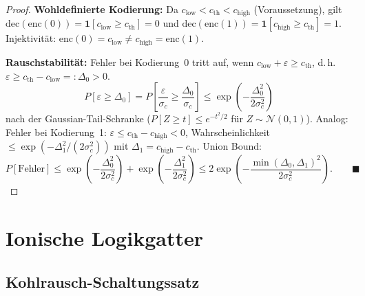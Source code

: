 ﻿\documentclass[a4paper,12pt]{article}
\theoremstyle{plain}
\theoremstyle{definition}
\theoremstyle{remark}
\newcommand{\cth}{c_{\mathrm{th}}}
\begin{document}
\begin{proof}
\textbf{Wohldefinierte Kodierung:}
Da $c_{\mathrm{low}} < \cth < c_{\mathrm{high}}$ (Voraussetzung),
gilt $\mathrm{dec}(\mathrm{enc}(0)) = \mathbf{1}[c_{\mathrm{low}} \geq \cth] = 0$
und $\mathrm{dec}(\mathrm{enc}(1)) = \mathbf{1}[c_{\mathrm{high}} \geq \cth] = 1$.
Injektivit\"at: $\mathrm{enc}(0) = c_{\mathrm{low}} \neq c_{\mathrm{high}} = \mathrm{enc}(1)$.

\textbf{Rauschstabilit\"at:}
Fehler bei Kodierung~0 tritt auf, wenn $c_{\mathrm{low}} + \varepsilon \geq \cth$,
d.\,h.\ $\varepsilon \geq \cth - c_{\mathrm{low}} =: \Delta_0 > 0$.
\[
P[\varepsilon \geq \Delta_0] = P\!\left[\frac{\varepsilon}{\sigma_c} \geq \frac{\Delta_0}{\sigma_c}\right]
\leq \exp\!\left(-\frac{\Delta_0^2}{2\sigma_c^2}\right)
\]
nach der Gaussian-Tail-Schranke ($P[Z \geq t] \leq e^{-t^2/2}$ f\"ur $Z \sim \mathcal{N}(0,1)$).
Analog: Fehler bei Kodierung~1: $\varepsilon \leq \cth - c_{\mathrm{high}} < 0$,
Wahrscheinlichkeit $\leq \exp(-\Delta_1^2/(2\sigma_c^2))$ mit $\Delta_1 = c_{\mathrm{high}} - \cth$.
Union Bound:
\[
P[\text{Fehler}] \leq \exp\!\left(-\frac{\Delta_0^2}{2\sigma_c^2}\right)
+ \exp\!\left(-\frac{\Delta_1^2}{2\sigma_c^2}\right)
\leq 2\exp\!\left(-\frac{\min(\Delta_0,\Delta_1)^2}{2\sigma_c^2}\right). \qquad \blacksquare
\]
\end{proof}

\section{Ionische Logikgatter}

\subsection{Kohlrausch-Schaltungssatz}
\end{document}
